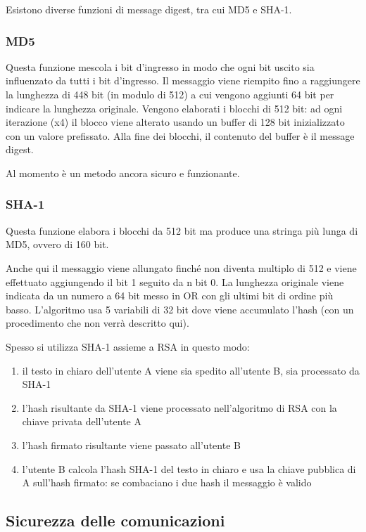 Esistono diverse funzioni di message digest, tra cui MD5 e SHA-1.

\subsubsection{MD5}
Questa funzione mescola i bit d'ingresso in modo che ogni bit uscito sia influenzato da tutti i bit d'ingresso.
Il messaggio viene riempito fino a raggiungere la lunghezza di 448 bit (in modulo di 512) a cui vengono aggiunti 64 bit per indicare la lunghezza originale.
Vengono elaborati i blocchi di 512 bit:
ad ogni iterazione (x4) il blocco viene alterato usando un buffer di 128 bit inizializzato con un valore prefissato.
Alla fine dei blocchi, il contenuto del buffer è il message digest.

Al momento è un metodo ancora sicuro e funzionante.

\subsubsection{SHA-1}
Questa funzione elabora i blocchi da 512 bit ma produce una stringa più lunga di MD5, ovvero di 160 bit.

Anche qui il messaggio viene allungato finché non diventa multiplo di 512 e viene effettuato aggiungendo il bit 1 seguito da n bit 0.
La lunghezza originale viene indicata da un numero a 64 bit messo in OR con gli ultimi bit di ordine più basso.
L'algoritmo usa 5 variabili di 32 bit dove viene accumulato l'hash (con un procedimento che non verrà descritto qui).

Spesso si utilizza SHA-1 assieme a RSA in questo modo:
\begin{enumerate}
\item il testo in chiaro dell'utente A viene sia spedito all'utente B, sia processato da SHA-1
\item l'hash risultante da SHA-1 viene processato nell'algoritmo di RSA con la chiave privata dell'utente A
\item l'hash firmato risultante viene passato all'utente B
\item l'utente B calcola l'hash SHA-1 del testo in chiaro e usa la chiave pubblica di A sull'hash firmato: se combaciano i due hash il messaggio è valido
\end{enumerate}

\subsection{Sicurezza delle comunicazioni} %
